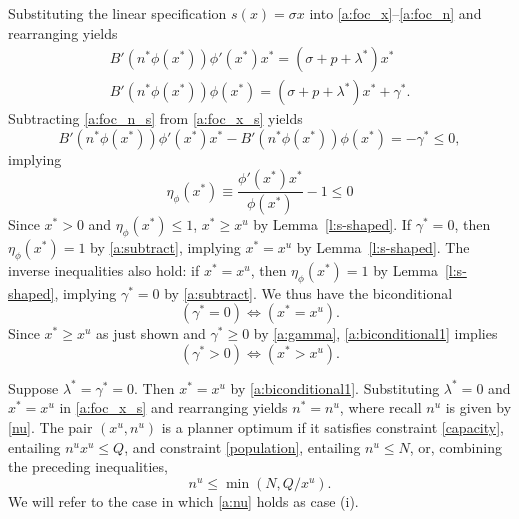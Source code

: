 \documentclass[12pt]{article}
\newcommand{\efficacy}{\phi}
\newcommand{\side}{s}
\newcommand{\benefit}{B}
\newcommand{\elasticity}[1]{\eta_{#1}}
\begin{document}
Substituting the linear specification $\side(x) = \sigma x$ into \eqref{a:foc_x}--\eqref{a:foc_n} and rearranging yields
\begin{gather}
\benefit'(n^* \efficacy(x^*)) \efficacy'(x^*) x^* = (\sigma + p + \lambda^*) x^* \label{a:foc_x_s} \\
\benefit'(n^* \efficacy(x^*)) \efficacy(x^*) = (\sigma + p + \lambda^*) x^* + \gamma^*. \label{a:foc_n_s}
\end{gather}
Subtracting \eqref{a:foc_n_s} from \eqref{a:foc_x_s} yields
\begin{equation}
\label{a:subtract}
\benefit'(n^* \efficacy(x^*)) \efficacy'(x^*) x^* - \benefit'(n^* \efficacy(x^*)) \efficacy(x^*) = - \gamma^* \leq 0,
\end{equation}
implying
\begin{equation}
\label{a:unit_elasticity}
\elasticity{\efficacy}(x^*) \equiv \frac{\efficacy'(x^*) x^*}{\efficacy(x^*)} - 1 \leq 0
\end{equation}
Since $x^* > 0$ and $\elasticity{\efficacy}(x^*) \leq 1$, $x^* \geq x^u$ by Lemma~\ref{l:s-shaped}. If $\gamma^* = 0$, then $\elasticity{\efficacy}(x^*) = 1$ by \eqref{a:subtract}, implying $x^* = x^u$ by Lemma~\ref{l:s-shaped}. The inverse inequalities also hold: if $x^* = x^u$, then $\elasticity{\efficacy}(x^*) = 1$ by Lemma~\ref{l:s-shaped}, implying $\gamma^* = 0$ by \eqref{a:subtract}. We thus have the biconditional
\begin{equation}
\label{a:biconditional1}
(\gamma^* = 0) \Leftrightarrow (x^* = x^u).
\end{equation}
Since $x^* \geq x^u$ as just shown and $\gamma^* \geq 0$ by \eqref{a:gamma}, \eqref{a:biconditional1} implies
\begin{equation}
\label{a:biconditional2}
(\gamma^* > 0) \Leftrightarrow (x^* > x^u).
\end{equation}

Suppose $\lambda^* = \gamma^* = 0$. Then $x^* = x^u$ by \eqref{a:biconditional1}. Substituting $\lambda^* = 0$ and $x^* = x^u$ in \eqref{a:foc_x_s} and rearranging yields $n^* = n^u$, where recall $n^u$ is given by \eqref{nu}. The pair $(x^u, n^u)$ is a planner optimum if it satisfies constraint \eqref{capacity}, entailing $n^u x^u \leq Q$, and constraint \eqref{population}, entailing $n^u \leq N$, or, combining the preceding inequalities, 
\begin{equation}
\label{a:nu}
n^u \leq \min(N, Q / x^u). 
\end{equation}
We will refer to the case in which \eqref{a:nu} holds as case (i).
\end{document}
